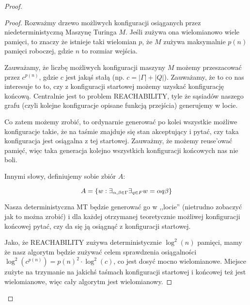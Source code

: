 \begin{proof}
\begin{proof}
        Rozważmy drzewo możliwych konfiguracji osiąganych przez niedeterministyczną Maszynę Turinga \(M\). Jeśli zużywa ona wielomianowo wiele pamięci, to znaczy że istnieje taki wielomian \(p\), że \(M\) zużywa maksymalnie \(p(n)\) pamięci roboczej, gdzie \(n\) to rozmiar wejścia. 
        
        Zauważamy, że liczbę możliwych konfiguracji maszyny \(M\) możemy przeszacować przez \(c^{p(n)}\), gdzie \(c\) jest jakąś stałą (np. \(c = |\Gamma| + |Q|\)). Zauważamy, że to co nas interesuje to to, czy z konfiguracji startowej możemy uzyskać konfigurację końcową. Centralnie jest to problem \textsc{REACHABILITY}, tyle że sąsiadów naszego grafu (czyli kolejne konfiguracje opisane funkcją przejścia) generujemy w locie. 
        
        Co zatem możemy zrobić, to ordynarnie generować po kolei wszystkie możliwe konfiguracje takie, że na taśmie znajduje się stan akceptujący i pytać, czy taka konfiguracja jest osiągalna z tej startowej. Zauważmy, że możemy reuse'ować pamięć, więc taka generacja kolejno wszystkich konfiguracji końcowych nas nie boli. 
        
        Innymi słowy, definiujemy sobie zbiór \(A\):
        
        \[ 
            A = \set{w : \exists_{\alpha, \beta \in \Gamma} \exists_{q \in F} w = \alpha q\beta}
        \]
        
        Nasza deterministyczna MT będzie generować go w ,,locie'' (nietrudno zobaczyć jak to można zrobić) i dla każdej otrzymanej teoretycznie możliwej konfiguracji końcowej pytać, czy da się ją osiągnąć z konfiguracji startowej.
        
        Jako, że \textsc{REACHABILITY} zużywa deterministycznie \(\log^2(n)\) pamięci, mamy że nasz algorytm będzie zużywać celem sprawdzenia osiągalności \(\log^2(c^{p(n)}) = p(n)^2 \cdot \log^2(c) \), co jest dosyć mocno wielomianowe. Miejsce zużyte na trzymanie na jakichś taśmach konfiguracji startowej i końcowej też jest wielomianowe, więc cały algorytm jest wielomianowy. 
    \end{proof}
    
\end{proof}
